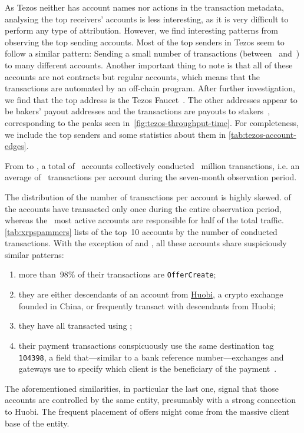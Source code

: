 

As Tezos neither has account names nor actions in the transaction metadata, analysing the top receivers' accounts is less interesting, as it is very difficult to perform any type of attribution. However, we find interesting patterns from observing the top sending accounts.
Most of the top senders in Tezos seem to follow a similar pattern: Sending a small number of transactions (between~ and~) to many different accounts. 
Another important thing to note is that all of these accounts are not contracts but regular accounts, which means that the transactions are automated by an off-chain program.
After further investigation, we find that the top address is the Tezos Faucet~\cite{tezos-faucet}. The other addresses appear to be bakers' payout addresses and the transactions are payouts to stakers~\cite{backerei}, corresponding to the peaks seen in~\autoref{fig:tezos-throughput-time}. For completeness, we include the top senders and some statistics about them in \autoref{tab:tezos-account-edges}.

From \startdate to \finishdate, a total of~ accounts collectively conducted~ million transactions, i.e. an average of~ transactions per account during the seven-month observation period.

The distribution of the number of transactions per account is highly skewed. 
 of the accounts have transacted only once during the entire observation period, whereas the~ most active accounts are responsible for half of the total traffic. 
\autoref{tab:xrpspammers} lists of the top~10 accounts by the number of conducted transactions. 
With the exception of  and , all these accounts share suspiciously similar patterns:
\begin{enumerate}
    \item more than~98\% of their transactions are \texttt{OfferCreate};
    \item they are either descendants of an account from \href{https://www.huobi.com/}{Huobi}, a crypto exchange founded in China, or frequently transact with descendants from Huobi;
    \item they have all transacted using ;
    \item their payment transactions conspicuously use the same destination tag \texttt{104398}, a field that---similar to a bank reference number---exchanges and gateways use to specify which client is the beneficiary of the payment~\cite{XRPLedger2020b}.
\end{enumerate}
%
The aforementioned similarities, in particular the last one, signal that those accounts are controlled by the same entity, presumably with a strong connection to Huobi. 
The frequent placement of offers might come from the massive client base of the entity.

